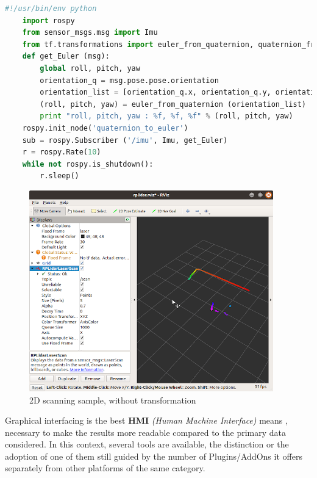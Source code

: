 \documentclass[Afour,sageh,times]{sagej}
\begin{document}
\begin{lstlisting}[language=Python, caption=Python code for conversion Quat to Euler]
    #!/usr/bin/env python
    import rospy
    from sensor_msgs.msg import Imu
    from tf.transformations import euler_from_quaternion, quaternion_from_euler
    def get_Euler (msg):
        global roll, pitch, yaw
        orientation_q = msg.pose.pose.orientation
        orientation_list = [orientation_q.x, orientation_q.y, orientation_q.z, orientation_q.w]
        (roll, pitch, yaw) = euler_from_quaternion (orientation_list)
        print "roll, pitch, yaw : %f, %f, %f" % (roll, pitch, yaw)
    rospy.init_node('quaternion_to_euler')
    sub = rospy.Subscriber ('/imu', Imu, get_Euler)
    r = rospy.Rate(10)
    while not rospy.is_shutdown():
        r.sleep()
\end{lstlisting}

\begin{figure}
    \centering
    \includegraphics[scale=20]{result3.png}
    \caption{2D scanning sample, without transformation}
    \label{fig:2dscanWtoutConv}
\end{figure}

Graphical interfacing is the best \textbf{HMI} \textit{(Human Machine Interface)} means \citep{Kumar2016}, necessary to make the results more readable compared to the primary data considered. In this context, several tools are available, the distinction or the adoption of one of them still guided by the number of Plugins/AddOns it offers separately from other platforms of the same category.
\end{document}
